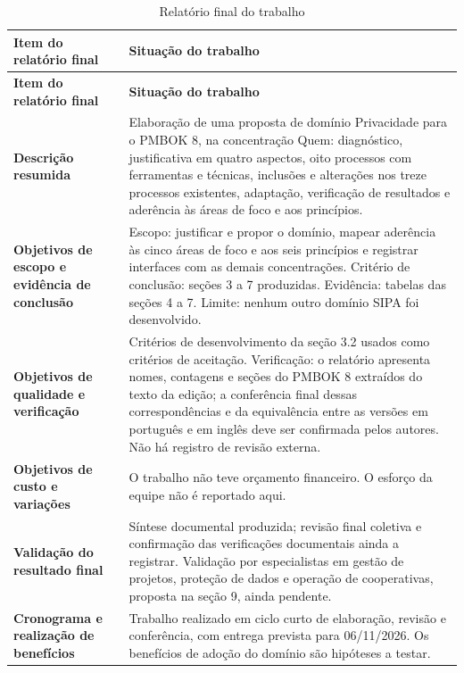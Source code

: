 \documentclass[11pt,a4paper]{article}
\newcommand{\SingleSpacing}{}
\begin{document}
\begingroup\SingleSpacing\small
\begin{longtable}{@{}>{\raggedright\arraybackslash}p{}>{\raggedright\arraybackslash}p{}@{}}
\caption{Relatório final do trabalho}\label{tab:t12}\\
\toprule
\textbf{Item do relatório final} & \textbf{Situação do trabalho}\\
\midrule
\endfirsthead
\toprule
\textbf{Item do relatório final} & \textbf{Situação do trabalho}\\
\midrule
\endhead
\bottomrule
\endfoot
\bottomrule
\endlastfoot
\textbf{Descrição resumida} & Elaboração de uma proposta de domínio Privacidade para o PMBOK 8, na concentração Quem: diagnóstico, justificativa em quatro aspectos, oito processos com ferramentas e técnicas, inclusões e alterações nos treze processos existentes, adaptação, verificação de resultados e aderência às áreas de foco e aos princípios.\\[3pt]
\textbf{Objetivos de escopo e evidência de conclusão} & Escopo: justificar e propor o domínio, mapear aderência às cinco áreas de foco e aos seis princípios e registrar interfaces com as demais concentrações. Critério de conclusão: seções 3 a 7 produzidas. Evidência: tabelas das seções 4 a 7. Limite: nenhum outro domínio SIPA foi desenvolvido.\\[3pt]
\textbf{Objetivos de qualidade e verificação} & Critérios de desenvolvimento da seção 3.2 usados como critérios de aceitação. Verificação: o relatório apresenta nomes, contagens e seções do PMBOK 8 extraídos do texto da edição; a conferência final dessas correspondências e da equivalência entre as versões em português e em inglês deve ser confirmada pelos autores. Não há registro de revisão externa.\\[3pt]
\textbf{Objetivos de custo e variações} & O trabalho não teve orçamento financeiro. O esforço da equipe não é reportado aqui.\\[3pt]
\textbf{Validação do resultado final} & Síntese documental produzida; revisão final coletiva e confirmação das verificações documentais ainda a registrar. Validação por especialistas em gestão de projetos, proteção de dados e operação de cooperativas, proposta na seção 9, ainda pendente.\\[3pt]
\textbf{Cronograma e realização de benefícios} & Trabalho realizado em ciclo curto de elaboração, revisão e conferência, com entrega prevista para 06/11/2026. Os benefícios de adoção do domínio são hipóteses a testar.\\[3pt]

\end{longtable}
\end{document}
